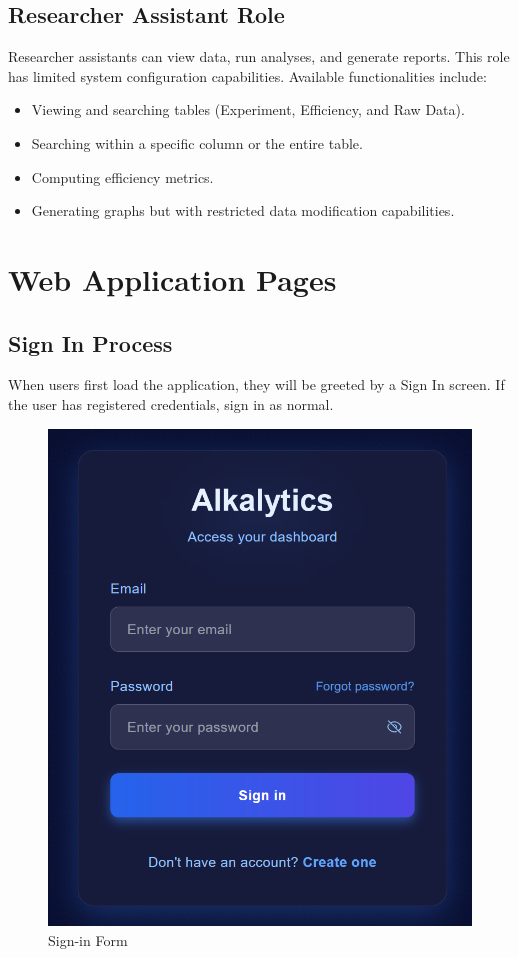\documentclass[12pt]{article}
\begin{document}
\subsection{Researcher Assistant Role}
Researcher assistants can view data, run analyses, and generate reports. This
role has limited system configuration capabilities. \newline\newline
Available functionalities include:
\begin{itemize}
    \item Viewing and searching tables (Experiment, Efficiency, and Raw Data).
    \item Searching within a specific column or the entire table.
    \item Computing efficiency metrics.
    \item Generating graphs but with restricted data modification capabilities.
\end{itemize}

\newpage
\section{Web Application Pages}

\subsection{Sign In Process}
When users first load the application, they will be greeted by a Sign In screen. 
If the user has registered credentials, sign in as normal.
\begin{figure}[H]
    \centering
    \includegraphics[scale=0.55]{./Diagrams/login .png}
    \caption{Sign-in Form}
    \label{fig:login}
\end{figure}
\end{document}
